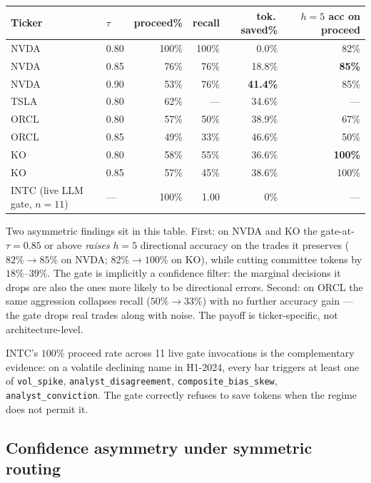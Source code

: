\documentclass[11pt,a4paper]{article}
\begin{document}
\begin{center}\footnotesize
\begin{tabular}{llrrrr}
\toprule
Ticker & $\tau$ & proceed\% & recall & tok.\,saved\% & $h{=}5$ acc on proceed \\
\midrule
NVDA & 0.80 & 100\% & 100\% &  0.0\% & 82\% \\
NVDA & 0.85 & 76\%  & 76\%  & 18.8\% & \textbf{85\%} \\
NVDA & 0.90 & 53\%  & 76\%  & \textbf{41.4\%} & 85\% \\
\midrule
TSLA & 0.80 & 62\%  & ---   & 34.6\% & --- \\
\midrule
ORCL & 0.80 & 57\%  & 50\%  & 38.9\% & 67\% \\
ORCL & 0.85 & 49\%  & 33\%  & 46.6\% & 50\% \\
\midrule
KO   & 0.80 & 58\%  & 55\%  & 36.6\% & \textbf{100\%} \\
KO   & 0.85 & 57\%  & 45\%  & 38.6\% & 100\% \\
\midrule
INTC (live LLM gate, $n{=}11$) & --- & 100\% & 1.00 & 0\% & --- \\
\bottomrule
\end{tabular}
\end{center}

Two asymmetric findings sit in this table. First: on NVDA and KO the
gate-at-$\tau{=}0.85$ or above \emph{raises} $h{=}5$ directional
accuracy on the trades it preserves ($82\%{\to}85\%$ on NVDA;
$82\%{\to}100\%$ on KO), while cutting committee tokens by $18\%$--$39\%$.
The gate is implicitly a confidence filter: the marginal decisions it
drops are also the ones more likely to be directional errors. Second:
on ORCL the same aggression collapses recall ($50\%{\to}33\%$) with
no further accuracy gain --- the gate drops real trades along with
noise. The payoff is ticker-specific, not architecture-level.

INTC's $100\%$ proceed rate across 11 live gate invocations is the
complementary evidence: on a volatile declining name in H1-2024,
every bar triggers at least one of
\texttt{vol\_spike}, \texttt{analyst\_disagreement},
\texttt{composite\_bias\_skew}, \texttt{analyst\_conviction}. The gate
correctly refuses to save tokens when the regime does not permit it.

\subsection{Confidence asymmetry under symmetric routing}
\label{sec:results-asymmetry}
\end{document}
